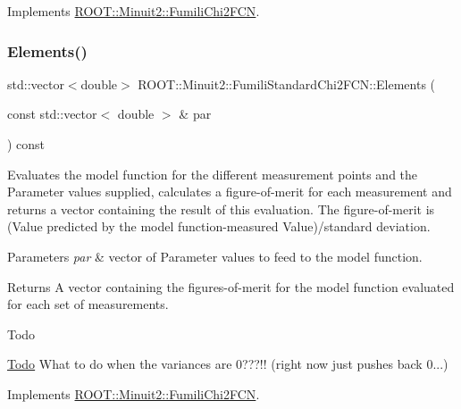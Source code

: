 Implements \mbox{\hyperlink{classROOT_1_1Minuit2_1_1FumiliChi2FCN_a25cc8dcc2eff831b3c0a94bf5413c2cd}{R\+O\+O\+T\+::\+Minuit2\+::\+Fumili\+Chi2\+F\+CN}}.

\mbox{\label{classROOT_1_1Minuit2_1_1FumiliStandardChi2FCN_ab05d3fe2dcb9b1c56b6753debe5e0064}} 
\subsubsection{\texorpdfstring{Elements()}{Elements()}\hspace{0.1cm}{\footnotesize\ttfamily [3/3]}}
{\footnotesize\ttfamily std\+::vector$<$double$>$ R\+O\+O\+T\+::\+Minuit2\+::\+Fumili\+Standard\+Chi2\+F\+C\+N\+::\+Elements (\begin{DoxyParamCaption}\item[{const std\+::vector$<$ double $>$ \&}]{par }\end{DoxyParamCaption}) const\hspace{0.3cm}{\ttfamily [virtual]}}

Evaluates the model function for the different measurement points and the Parameter values supplied, calculates a figure-\/of-\/merit for each measurement and returns a vector containing the result of this evaluation. The figure-\/of-\/merit is (Value predicted by the model function-\/measured Value)/standard deviation.


\begin{DoxyParams}{Parameters}
{\em par} & vector of Parameter values to feed to the model function.\\
\hline
\end{DoxyParams}
\begin{DoxyReturn}{Returns}
A vector containing the figures-\/of-\/merit for the model function evaluated for each set of measurements.
\end{DoxyReturn}
\begin{DoxyRefDesc}{Todo}
\item[\mbox{\hyperlink{todo__todo000034}{Todo}}]What to do when the variances are 0???!! (right now just pushes back 0...)\end{DoxyRefDesc}


Implements \mbox{\hyperlink{classROOT_1_1Minuit2_1_1FumiliChi2FCN_a25cc8dcc2eff831b3c0a94bf5413c2cd}{R\+O\+O\+T\+::\+Minuit2\+::\+Fumili\+Chi2\+F\+CN}}.

